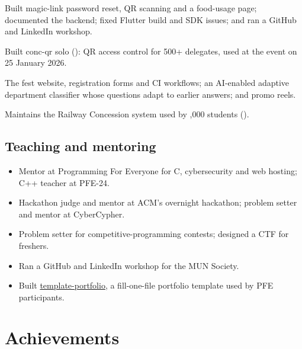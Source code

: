  Built magic-link password reset, QR scanning and a food-usage page;
documented the backend; fixed Flutter build and SDK issues; and ran a GitHub and LinkedIn workshop.

 Built conc-qr solo (): QR
access control for 500+ delegates, used at the event on 25 January 2026.

 The fest website, registration forms and CI workflows;
an AI-enabled adaptive department classifier whose questions adapt to earlier answers; and promo
reels.

 Maintains the Railway Concession system used by ,000 students
().

\subsection{Teaching and mentoring}
\begin{itemize}
  \item Mentor at Programming For Everyone for C, cybersecurity and web hosting; C++ teacher at PFE-24.
  \item Hackathon judge and mentor at ACM's overnight hackathon; problem setter and mentor at
        CyberCypher.
  \item Problem setter for competitive-programming contests; designed a CTF for freshers.
  \item Ran a GitHub and LinkedIn workshop for the MUN Society.
  \item Built \href{https://github.com/KartikJain14/template-portfolio}{template-portfolio}, a
        fill-one-file portfolio template used by PFE participants.
\end{itemize}

\section{Achievements}\label{sec:awards}

